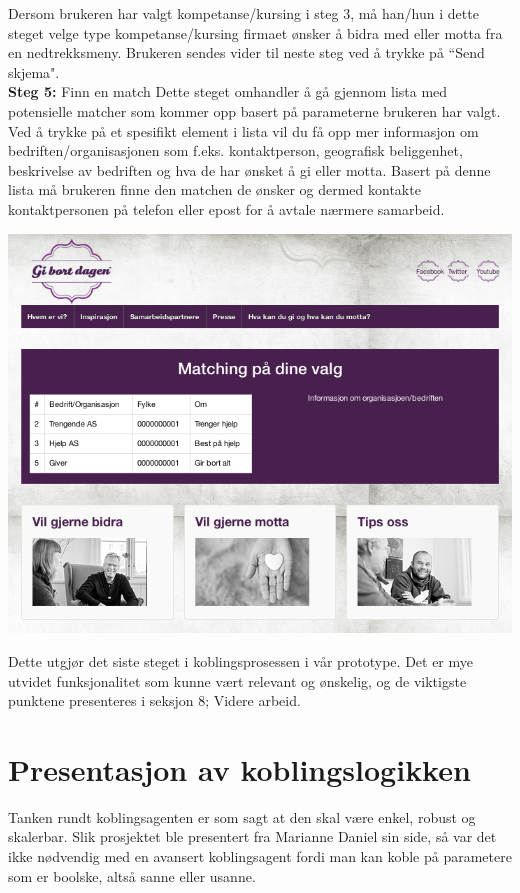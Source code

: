 Dersom brukeren har valgt kompetanse/kursing i steg 3, må han/hun i dette steget velge type kompetanse/kursing firmaet ønsker å bidra med eller motta fra en nedtrekksmeny. Brukeren sendes vider til neste steg ved å trykke på ``Send skjema".\\

{\bf Steg 5:} Finn en match
Dette steget omhandler å gå gjennom lista med potensielle matcher som kommer opp basert på parameterne brukeren har valgt. Ved å trykke på et spesifikt element i lista vil du få opp mer informasjon om bedriften/organisasjonen som f.eks. kontaktperson, geografisk beliggenhet, beskrivelse av bedriften og hva de har ønsket å gi eller motta. Basert på denne lista må brukeren finne den matchen de ønsker og dermed kontakte kontaktpersonen på telefon eller epost for å avtale nærmere samarbeid.\\
\begin{center}
\includegraphics[clip=true, width=1 \textwidth,
trim=0cm 0cm 0cm 0cm]{match.png}
\label{fig:match}
\end{center}

Dette utgjør det siste steget i koblingsprosessen i vår prototype. Det er mye utvidet funksjonalitet som kunne vært relevant og ønskelig, og de viktigste punktene presenteres i seksjon 8; Videre arbeid.\\

\section{Presentasjon av koblingslogikken}
Tanken rundt koblingsagenten er som sagt at den skal være enkel, robust og skalerbar. Slik prosjektet ble presentert fra Marianne Daniel sin side, så var det ikke nødvendig med en avansert koblingsagent fordi man kan koble på parametere som er boolske, altså sanne eller usanne.\\

